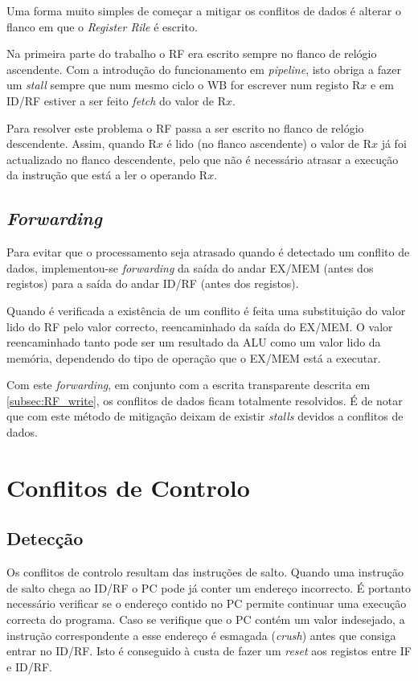 \documentclass[a4paper]{article}
\begin{document}
	Uma forma muito simples de começar a mitigar os conflitos de dados é alterar o flanco em que o \textit{Register Rile} é escrito.
	
	Na primeira parte do trabalho o RF era escrito sempre no flanco de relógio ascendente. Com a introdução do funcionamento em \textit{pipeline}, isto obriga a fazer um \textit{stall} sempre que num mesmo ciclo o WB for escrever num registo R$x$ e em ID/RF estiver a ser feito \textit{fetch} do valor de R$x$.
	
	Para resolver este problema o RF passa a ser escrito no flanco de relógio descendente. Assim, quando R$x$ é lido (no flanco ascendente) o valor de R$x$ já foi actualizado no flanco descendente, pelo que não é necessário atrasar a execução da instrução que está a ler o operando R$x$.
	
	\subsection{\textit{Forwarding}}
	
	Para evitar que o processamento seja atrasado quando é detectado um conflito de dados, implementou-se \textit{forwarding} da saída do andar EX/MEM (antes dos registos) para a saída do andar ID/RF (antes dos registos).
	
	Quando é verificada a existência de um conflito é feita uma substituição do valor lido do RF pelo valor correcto, reencaminhado da saída do EX/MEM. O valor reencaminhado tanto pode ser um resultado da ALU como um valor lido da memória, dependendo do tipo de operação que o EX/MEM está a executar.
	
	Com este \textit{forwarding}, em conjunto com a escrita transparente descrita em \ref{subsec:RF_write}, os conflitos de dados ficam totalmente resolvidos. É de notar que com este método de mitigação deixam de existir \textit{stalls} devidos a conflitos de dados.
	
	\section{Conflitos de Controlo}
	
	\subsection{Detecção}
	
	Os conflitos de controlo resultam das instruções de salto. Quando uma instrução de salto chega ao ID/RF o PC pode já conter um endereço incorrecto. É portanto necessário verificar se o endereço contido no PC permite continuar uma execução correcta do programa. Caso se verifique que o PC contém um valor indesejado, a instrução correspondente a esse endereço é esmagada (\textit{crush}) antes que consiga entrar no ID/RF. Isto é conseguido à custa de fazer um \textit{reset} aos registos entre IF e ID/RF.
	
\end{document}
